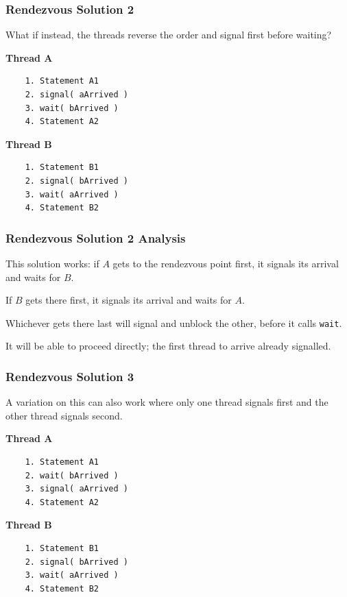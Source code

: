 \begin{frame}[fragile]
\frametitle{Rendezvous Solution 2}

What if instead, the threads reverse the order and signal first before waiting?

\begin{multicols}{2}
\textbf{Thread A}
  \begin{verbatim}
	1. Statement A1
	2. signal( aArrived )
	3. wait( bArrived )
	4. Statement A2
  \end{verbatim}
\columnbreak
\textbf{Thread B}
  \begin{verbatim}
	1. Statement B1
	2. signal( bArrived )
	3. wait( aArrived )
	4. Statement B2
  \end{verbatim}
\end{multicols}
\vspace{-2em}


\end{frame}

\begin{frame}
\frametitle{Rendezvous Solution 2 Analysis}

This solution works: if $A$ gets to the rendezvous point first, it signals its arrival and waits for $B$. 

If $B$ gets there first, it signals its arrival and waits for $A$. 

Whichever gets there last will signal and unblock the other, before it calls \texttt{wait}.

It will be able to proceed directly; the first thread to arrive already signalled. 


\end{frame}

\begin{frame}[fragile]
\frametitle{Rendezvous Solution 3}

A variation on this can also work where only one thread signals first and the other thread signals second.

\begin{multicols}{2}
\textbf{Thread A}
  \begin{verbatim}
	1. Statement A1
	2. wait( bArrived )
	3. signal( aArrived )
	4. Statement A2
  \end{verbatim}
\columnbreak
\textbf{Thread B}
  \begin{verbatim}
	1. Statement B1
	2. signal( bArrived )
	3. wait( aArrived )
	4. Statement B2
  \end{verbatim}
\end{multicols}
\vspace{-2em}


\end{frame}

